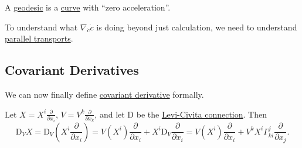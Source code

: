 \begin{intuition}
	A \hyperref[def:geodesic]{geodesic} is a \hyperref[def:curve]{curve} with ``zero acceleration''.
\end{intuition}

To understand what \(\nabla _{\dot{c} } \dot{c} \) is doing beyond just calculation, we need to understand \hyperref[def:parallel-transport]{parallel transports}.

\subsection{Covariant Derivatives}
We can now finally define \hyperref[def:covariant-derivative]{covariant derivative} formally.

\begin{prev}
	Let \(X = X^i \frac{\partial }{\partial x_i}\), \(V = V^k \frac{\partial}{\partial x_k}\), and let \(\mathrm{D} \) be the \hyperref[def:Levi-Civita-connection]{Levi-Civita connection}. Then
	\[
		\mathrm{D}_V X
		= \mathrm{D} _V \left( X^i \frac{\partial}{\partial x_i} \right)
		= V(X^i) \frac{\partial}{\partial x_i} + X^i \mathrm{D} _V \frac{\partial}{\partial x_i}
		= V(X^i)\frac{\partial}{\partial x_i} + V^k X^i \Gamma ^j_{ki} \frac{\partial }{\partial x_j} .
	\]
\end{prev}

